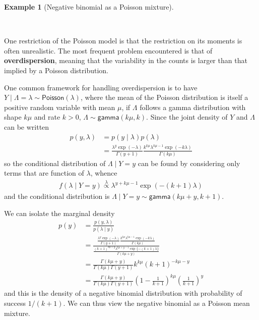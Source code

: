 \documentclass[
  11pt,
  letterpaper,
]{scrbook}
\theoremstyle{definition}
\theoremstyle{plain}
\theoremstyle{plain}
\theoremstyle{definition}
\newtheorem{example}{Example}[chapter]
\theoremstyle{definition}
\theoremstyle{remark}
\begin{document}
\begin{example}[Negative binomial as a Poisson
mixture]\protect\hypertarget{exm-poisson-negbin}{}\label{exm-poisson-negbin}

~

One restriction of the Poisson model is that the restriction on its
moments is often unrealistic. The most frequent problem encountered is
that of \textbf{overdispersion}, meaning that the variability in the
counts is larger than that implied by a Poisson distribution.

One common framework for handling overdispersion is to have
\(Y \mid \Lambda = \lambda \sim \mathsf{Poisson}(\lambda)\), where the
mean of the Poisson distribution is itself a positive random variable
with mean \(\mu\), if \(\Lambda\) follows a gamma distribution with
shape \(k\mu\) and rate \(k>0\),
\(\Lambda \sim \mathsf{gamma}(k\mu, k)\). Since the joint density of
\(Y\) and \(\Lambda\) can be written \begin{align*}
p(y, \lambda) &= p(y \mid \lambda)p(\lambda) \\
&= \frac{\lambda^y\exp(-\lambda)}{\Gamma(y+1)}  \frac{k^{k\mu}\lambda^{k\mu-1}\exp(-k\lambda)}{\Gamma(k\mu)}
\end{align*} so the conditional distribution of \(\Lambda \mid Y=y\) can
be found by considering only terms that are function of \(\lambda\),
whence \begin{align*}
f(\lambda \mid Y=y) \stackrel{\lambda}{\propto}\lambda^{y+k\mu-1}\exp(-(k+1)\lambda)
\end{align*} and the conditional distribution is
\(\Lambda \mid Y=y \sim \mathsf{gamma}(k\mu + y, k+1)\).

We can isolate the marginal density \begin{align*}
p(y) &= \frac{p(y, \lambda)}{p(\lambda \mid y)} \\&= \frac{\frac{\lambda^y\exp(-\lambda)}{\Gamma(y+1)}  \frac{k^{k\mu}\lambda^{k\mu-1}\exp(-k\lambda)}{\Gamma(k\mu)}}{ \frac{(k+1)^{k\mu+y}\lambda^{k\mu+y-1}\exp\{-(k+1)\lambda\}}{\Gamma(k\mu+y)}}\\
&= \frac{\Gamma(k\mu+y)}{\Gamma(k\mu)\Gamma(y+1)}k^{k\mu} (k+1)^{-k\mu-y}\\&= \frac{\Gamma(k\mu+y)}{\Gamma(k\mu)\Gamma(y+1)}\left(1-\frac{1}{k+1}\right)^{k\mu} \left(\frac{1}{k+1}\right)^y
\end{align*} and this is the density of a negative binomial distribution
with probability of success \(1/(k+1)\). We can thus view the negative
binomial as a Poisson mean mixture.


\end{example}
\end{document}
